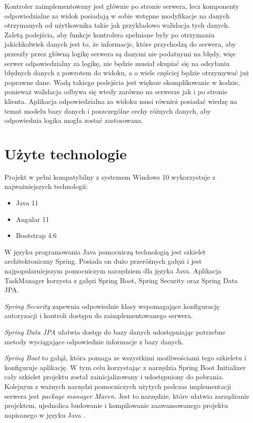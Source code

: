 Kontroler zaimplementowany jest głównie po stronie serwera, lecz komponenty odpowiedzialne za widok posiadają w sobie wstępne modyfikacje na danych otrzymanych od użytkownika takie jak przykładowo walidacja tych danych. Zaletą podejścia, aby funkcje kontrolera spełniane były po otrzymaniu jakichkolwiek danych jest to, że informacje, które przychodzą do serwera, aby przeszły przez główną logikę serwera są danymi nie podatnymi na błędy, więc serwer odpowiedzialny za logikę, nie będzie musiał skupiać się na odsyłaniu błędnych danych z powrotem do widoku, a o wiele częściej będzie otrzymywać już poprawne dane. Wadą takiego podejścia jest większe skomplikowanie w kodzie, ponieważ walidacja odbywa się wtedy zarówno na serwerze jak i po stronie klienta. Aplikacja odpowiedzialna za widoku musi również posiadać wiedzę na temat modelu bazy danych i poszczególne cechy różnych danych, aby odpowiednia logika mogła zostać zastosowana.


\section{Użyte technologie}
Projekt w pełni kompatybilny z systemem Windows 10 wykorzystuje z najważniejszych technologii:
\begin{itemize}
	\item Java 11
	\item Angular 11
	\item Bootstrap 4.6
	
\end{itemize}
W języku programowania Java pomocniczą technologią jest szkielet architektoniczny Spring. Posiada on dużo przeróżnych gałęzi i jest najpopularniejszym pomocniczym narzędziem dla języka Java. Aplikacja TaskManager korzysta z gałęzi Spring Boot, Spring Security oraz Spring Data JPA. 

\textit{Spring Security} zapewnia odpowiednie klasy wspomagające konfigurację autoryzacji i kontroli dostępu do zaimplementowanego serwera. \cite{SpringSecurity}   

\textit{Spring Data JPA} ułatwia dostęp do bazy danych udostępniając potrzebne metody wyciągające odpowiednie informacje z bazy danych.\cite{SpringData}  

\textit{Spring Boot} to gałąź, która pomaga ze wszystkimi możliwościami tego szkieletu i konfiguruje aplikację. 
W tym celu korzystając z narzędzia Spring Boot Initializer \cite{SpringInitializr} cały szkielet projektu został zainicjalizowany i udostępniony do pobrania.
Kolejnym z ważnych narzędzi pomocniczych użytych podczas implementacji serwera jest \textit{package manager Maven}. Jest to narzędzie, które ułatwia zarządzanie projektem, ujednolica budowanie i kompilowanie zaawansowanego projektu napisanego w języku Java \cite{ApacheMavenProject}. 

